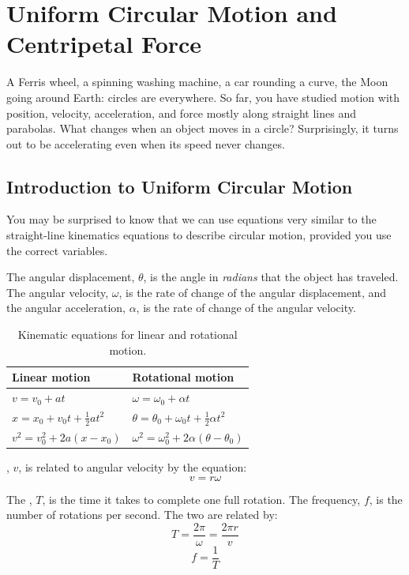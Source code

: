 \chapter{Uniform Circular Motion and Centripetal Force}


A Ferris wheel, a spinning washing machine, a car rounding a curve, the
Moon going around Earth: circles are everywhere. So far, you have studied
motion with position, velocity, acceleration, and force mostly along
straight lines and parabolas. What changes when an object moves in a
circle? Surprisingly, it turns out to be accelerating even when its speed
never changes.
\section{Introduction to Uniform Circular Motion}
You may be surprised to know that we can use equations very similar to
the straight-line kinematics equations to describe circular motion, provided you use the correct variables.

The angular displacement, $\theta$, is the angle in \emph{radians} that the object has traveled. The angular velocity, $\omega$, is the rate of change of the angular displacement, and the angular acceleration, $\alpha$, is the rate of change of the angular velocity.


\begin{table}[H]
  \centering
  \begin{tabular}{l l}
    Linear motion                          & Rotational motion                                          \\ \hline
    $v = v_0 + a t$                        & $\omega = \omega_0 + \alpha t$                             \\[4pt]
    $x = x_0 + v_0 t + \tfrac{1}{2} a t^2$ & $\theta = \theta_0 + \omega_0 t + \tfrac{1}{2} \alpha t^2$ \\[4pt]
    $v^2 = v_0^2 + 2a(x - x_0)$            & $\omega^2 = \omega_0^2 + 2\alpha(\theta - \theta_0)$
  \end{tabular}
  \caption{Kinematic equations for linear and rotational motion.}
  \label{tab:kinematics_eqs}
\end{table}

, $v$, is related to angular velocity by the equation:
$$v = r \omega$$

The , $T$, is the time it takes to complete one full rotation. The frequency, $f$, is the number of rotations per second. The two are related by:
$$T = \frac{2\pi}{\omega} = \frac{2\pi r}{v}$$
$$f = \frac{1}{T}$$

